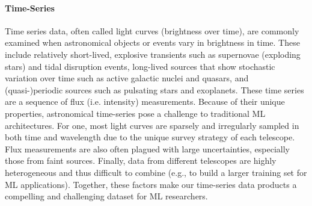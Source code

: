 \documentclass[dvipsnames,table]{article}
\begin{document}
\paragraph{Time-Series}
Time series data, often called light curves (brightness over time), are commonly examined when astronomical objects or events vary in brightness in time. These include relatively short-lived, explosive transients such as supernovae (exploding stars) and tidal disruption events, long-lived sources that show stochastic variation over time such as active galactic nuclei and quasars, and (quasi-)periodic sources such as pulsating stars and exoplanets. These time series are a sequence of flux (i.e. intensity) measurements. Because of their unique properties, astronomical time-series pose a challenge to traditional ML architectures. For one, most light curves are sparsely and irregularly sampled in both time and wavelength due to the unique survey strategy of each telescope. Flux measurements are also often plagued with large uncertainties, especially those from faint sources. Finally, data from different telescopes are highly heterogeneous and thus difficult to combine (e.g., to build a larger training set for ML applications). Together, these factors make our time-series data products a compelling and challenging dataset for ML researchers.



    
\end{document}
